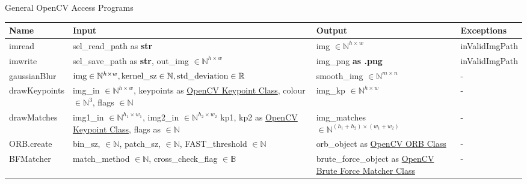 \documentclass[12pt, titlepage]{article}
\begin{document}
General OpenCV Access Programs
\begin{center}
\begin{tabular}{p{3.5cm} p{4.5cm} p{4.5cm} p{2cm}}
\hline
\textbf{Name} & \textbf{Input} & \textbf{Output} & \textbf{Exceptions} \\
\hline
imread & sel\_read\_path as \textbf{str} & 
img $\in \mathbb{N}^{h \times w}$ & inValidImgPath \\
\hline
imwrite & sel\_save\_path as \textbf{str}, \newline 
out\_img $\in \mathbb{N}^{h \times w}$ & 
img\_png \textbf{as .png} & inValidImgPath \\
\hline
gaussianBlur & $\text{img} \in \mathbb{N}^{h \times w}, \newline 
\text{kernel\_sz} \in \mathbb{N}, \newline 
\text{std\_deviation} \in \mathbb{R} $
& smooth\_img $\in \mathbb{N}^{m\times n}$ & -\\
\hline
drawKeypoints & img\_in $\in \mathbb{N}^{h \times w}$, \newline
keypoints as \href{https://docs.opencv.org/3.4/d2/d29/classcv_1_1KeyPoint.html}{OpenCV Keypoint Class}, \newline
colour $\in \mathbb{N}^{3}$, \newline 
flags $\in \mathbb{N}$ & img\_kp $\in \mathbb{N}^{h \times w}$ & - \\
\hline
drawMatches& img1\_in $\in \mathbb{N}^{h_{1} \times w_{1}}$, \newline 
img2\_in $\in \mathbb{N}^{h_{2} \times w_{2}}$ \newline 
kp1, kp2 as \href{https://docs.opencv.org/3.4/d2/d29/classcv_1_1KeyPoint.html}{OpenCV Keypoint Class}, \newline
flags as $\in \mathbb{N}$
& img\_matches $\in \mathbb{N}^{(h_{1}+h_{2}) \times (w_{1}+w_{2})}$& - \\
\hline
ORB.create & bin\_sz, $\in \mathbb{N}$, \newline 
patch\_sz, $\in \mathbb{N}$, \newline 
FAST\_threshold $\in \mathbb{N}$ \newline 
& orb\_object as \href{https://docs.opencv.org/3.4/db/d95/classcv_1_1ORB.html}
{OpenCV ORB Class} & - \\
\hline
BFMatcher 
& match\_method $\in \mathbb{N}$, \newline 
cross\_check\_flag $\in \mathbb{B}$ 
& brute\_force\_object as \href{https://docs.opencv.org/3.4/d3/da1/classcv_1_1BFMatcher.html}
{OpenCV Brute Force Matcher Class} \newline 
& -\\
\hline
\end{tabular}
\end{center} 
\end{document}

